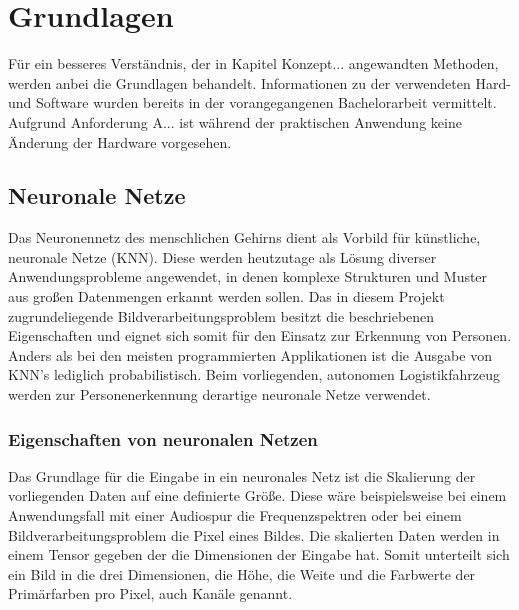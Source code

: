 \chapter{Grundlagen}
\label{ch: Grundlagen}
	Für ein besseres Verständnis, der in Kapitel Konzept... angewandten Methoden, werden anbei die Grundlagen behandelt. Informationen zu der verwendeten Hard- und Software wurden bereits in der vorangegangenen Bachelorarbeit vermittelt. Aufgrund Anforderung A... ist während der praktischen Anwendung keine Änderung der Hardware vorgesehen.
 
	
 	\section{Neuronale Netze}
	\label{sec: ROS}
	
	Das Neuronennetz des menschlichen Gehirns dient als Vorbild für künstliche, neuronale Netze (KNN). Diese werden heutzutage als Lösung diverser Anwendungsprobleme angewendet, in denen komplexe Strukturen und Muster aus großen Datenmengen erkannt werden sollen. Das in diesem Projekt zugrundeliegende Bildverarbeitungsproblem besitzt die beschriebenen Eigenschaften und eignet sich somit für den Einsatz zur Erkennung von Personen. Anders als bei den meisten programmierten Applikationen ist die Ausgabe von KNN's lediglich probabilistisch. Beim vorliegenden, autonomen Logistikfahrzeug werden zur Personenerkennung derartige neuronale Netze verwendet.
	
		\subsection{Eigenschaften von neuronalen Netzen}
		\label{subsec: Eigenschaften von neuronalen Netzen}
		Das Grundlage für die Eingabe in ein neuronales Netz ist die Skalierung der vorliegenden Daten auf eine definierte Größe. Diese wäre beispielsweise bei einem Anwendungsfall mit einer Audiospur die Frequenzspektren oder bei einem Bildverarbeitungsproblem die Pixel eines Bildes. Die skalierten Daten werden in einem Tensor gegeben der die Dimensionen der Eingabe hat. Somit unterteilt sich ein Bild in die drei Dimensionen, die Höhe, die Weite und die Farbwerte der Primärfarben pro Pixel, auch Kanäle genannt.\\
		
